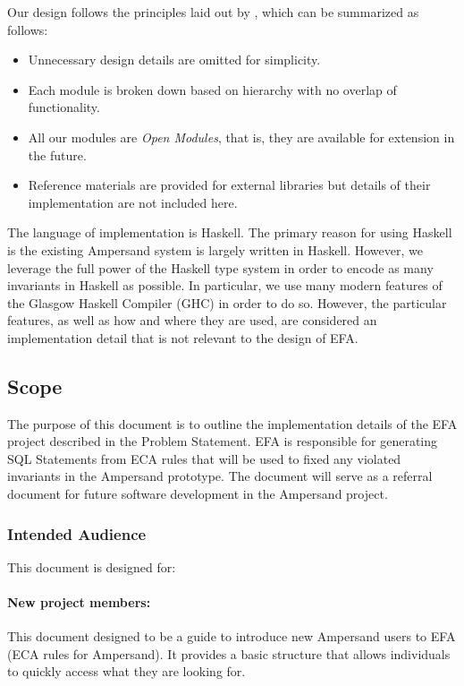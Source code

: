 \documentclass[12pt, svgnames]{article}
\begin{document}
Our design follows the principles laid out by \citep{modStruct}, which can be summarized as follows:
\begin{itemize}
\item Unnecessary design details are omitted for simplicity.
\item Each module is broken down based on hierarchy with no overlap of functionality.
\item All our modules are \emph{Open Modules}, that is, they are available for extension in the future.
\item Reference materials are provided for external libraries but details of
  their implementation are not included here. 
\end{itemize}

The language of implementation is Haskell. The primary reason for using Haskell
is the existing Ampersand system is largely written in Haskell. However, we
leverage the full power of the Haskell type system in order to encode as many
invariants in Haskell as possible. In particular, we use many modern features of
the Glasgow Haskell Compiler (GHC) in order to do so. However, the particular
features, as well as how and where they are used, are considered an
implementation detail that is not relevant to the design of EFA.

\subsection{Scope}
The purpose of this document is to outline the implementation details of the EFA project described in the Problem Statement.
EFA is responsible for generating SQL Statements from ECA rules that will 
be used to fixed any violated invariants in the Ampersand prototype. 
The document will serve as a referral document for future software development in the Ampersand project.

\subsubsection{Intended Audience}
This document is designed for:
\paragraph{New project members:}
This document designed to be a guide to introduce new Ampersand users to EFA 
(ECA rules for Ampersand). It provides a basic structure that allows 
individuals to quickly access what they are looking for.
   
\end{document}
